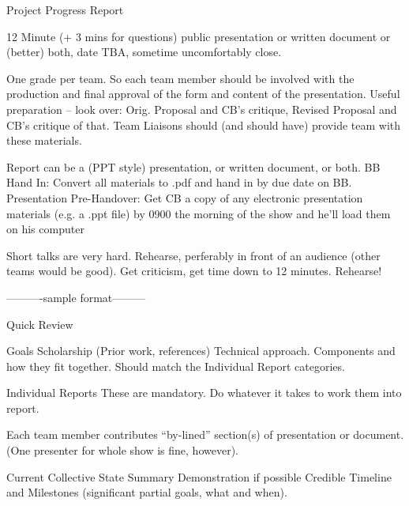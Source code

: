 

Project Progress Report

12 Minute (+ 3 mins for questions) public presentation or written document or
(better) both, date TBA, sometime uncomfortably close.

One grade per team.  So each team member should be involved
with the production and final approval of the form and content of the
presentation.  Useful preparation --  look over:  Orig. Proposal and 
CB's critique, Revised Proposal and CB's critique of that.  Team
Liaisons should (and should have) provide team with these materials.

Report can be a (PPT style) presentation, or written document, or both.
    BB Hand In: Convert all materials to .pdf and hand in by due date on BB.
    Presentation Pre-Handover: Get CB a copy of any electronic presentation
    materials (e.g. a .ppt file) by 0900 the morning of the show and he'll load
    them on his computer

    Short talks are very hard. Rehearse, perferably in front of an audience
    (other teams would be good). Get criticism, get time down to 12 minutes.
    Rehearse!



----------sample format---------



Quick Review

   Goals
   Scholarship (Prior work, references)
   Technical approach.  Components and how they fit together.  Should
   match the Individual Report categories.


Individual Reports
 These are mandatory. Do whatever it takes to work them into report.

  Each team member contributes  ``by-lined'' section(s) of presentation
  or document.  (One presenter for whole show is fine, however).


Current Collective State
   Summary
   Demonstration if possible
   Credible Timeline and Milestones (significant partial goals, what
   and when).







